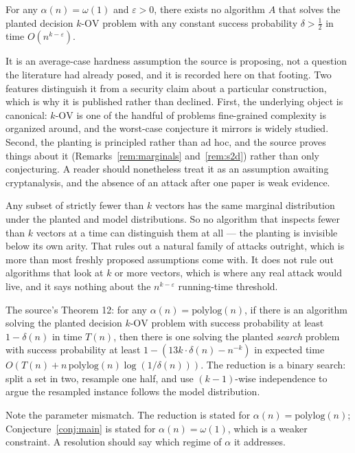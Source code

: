 \documentclass{aicr-conjecture}
\newcommand{\eps}{\varepsilon}
\newcommand{\kOV}{k\text{-}\mathrm{OV}}
\begin{document}
\begin{conjecture}\label{conj:main}
For any $\alpha(n) = \omega(1)$ and $\eps > 0$, there exists no algorithm
$A$ that solves the planted decision $\kOV$ problem with any constant
success probability $\delta > \tfrac{1}{2}$ in time $O(n^{k-\eps})$.
\end{conjecture}

\begin{remark}\label{rem:what-kind}
It is an average-case hardness assumption the source is proposing, not a
question the literature had already posed, and it is recorded here on
that footing. Two features distinguish it from a security claim about a
particular construction, which is why it is published rather than
declined. First, the underlying object is canonical: $\kOV$ is one of the
handful of problems fine-grained complexity is organized around, and the
worst-case conjecture it mirrors is widely studied. Second, the planting
is principled rather than ad hoc, and the source proves things about it
(Remarks~\ref{rem:marginals} and~\ref{rem:s2d}) rather than only
conjecturing. A reader should nonetheless treat it as an assumption
awaiting cryptanalysis, and the absence of an attack after one paper is
weak evidence.
\end{remark}

\begin{remark}\label{rem:marginals}
Any subset of strictly fewer than $k$ vectors has the same marginal
distribution under the planted and model distributions. So no algorithm
that inspects fewer than $k$ vectors at a time can distinguish them at
all --- the planting is invisible below its own arity. That rules out a
natural family of attacks outright, which is more than most freshly
proposed assumptions come with. It does not rule out algorithms that look
at $k$ or more vectors, which is where any real attack would live, and it
says nothing about the $n^{k-\eps}$ running-time threshold.
\end{remark}

\begin{remark}\label{rem:s2d}
The source's Theorem 12: for any $\alpha(n) = \mathrm{polylog}(n)$, if
there is an algorithm solving the planted decision $\kOV$ problem with
success probability at least $1 - \delta(n)$ in time $T(n)$, then there
is one solving the planted \emph{search} problem with success probability
at least $1 - (13k \cdot \delta(n) - n^{-k})$ in expected time
$O(T(n) + n\,\mathrm{polylog}(n)\log(1/\delta(n)))$. The reduction is a
binary search: split a set in two, resample one half, and use
$(k-1)$-wise independence to argue the resampled instance follows the
model distribution.

Note the parameter mismatch. The reduction is stated for $\alpha(n) =
\mathrm{polylog}(n)$; Conjecture~\ref{conj:main} is stated for
$\alpha(n) = \omega(1)$, which is a weaker constraint. A resolution
should say which regime of $\alpha$ it addresses.
\end{remark}
\end{document}
